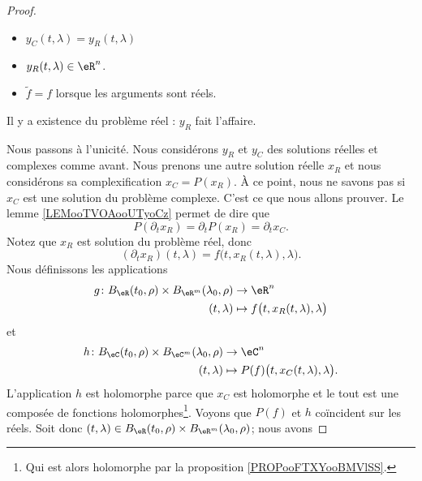 \begin{proof}
\begin{subproof}
\begin{itemize}
			\item
			      \( y_C(t,\lambda)=y_R(t,\lambda)\)
			\item
			      \( y_R(t,\lambda)\in \eR^n\).
			\item
			      \( \tilde f=f\) lorsque les arguments sont réels.
		\end{itemize}
		\spitem[Existence]
		Il y a existence du problème réel : \( y_R\) fait l'affaire.
	\end{subproof}
	Nous passons à l'unicité. Nous considérons \( y_R\) et \( y_C\) des solutions réelles et complexes comme avant. Nous prenons une autre solution réelle \( x_R\) et nous considérons sa complexification \( x_C=P(x_R)\). À ce point, nous ne savons pas si \( x_C\) est une solution du problème complexe. C'est ce que nous allons prouver. Le lemme \ref{LEMooTVOAooUTyoCz} permet de dire que
	\begin{equation}
		P(\partial_tx_R)=\partial_tP(x_R)=\partial_tx_C.
	\end{equation}
	Notez que \( x_R\) est solution du problème réel, donc
	\begin{equation}
		(\partial_tx_R)(t,\lambda)=f\big( t,x_R(t,\lambda),\lambda \big).
	\end{equation}
	Nous définissons les applications
	\begin{equation}
		\begin{aligned}
			g\colon B_{\eR}(t_0,\rho)\times B_{\eR^m}(\lambda_0,\rho) & \to \eR^n                                     \\
			(t,\lambda)                                               & \mapsto f\big( t,x_R(t,\lambda),\lambda \big)
		\end{aligned}
	\end{equation}
	et
	\begin{equation}
		\begin{aligned}
			h\colon B_{\eC}(t_0,\rho)\times B_{\eC^m}(\lambda_0,\rho) & \to \eC^n                                         \\
			(t,\lambda)                                               & \mapsto P(f)\big( t,x_C(t,\lambda),\lambda \big).
		\end{aligned}
	\end{equation}
	L'application \( h\) est holomorphe parce que \( x_C\) est holomorphe et le tout est une composée de fonctions holomorphes\footnote{Qui est alors holomorphe par la proposition \ref{PROPooFTXYooBMVlSS}.}. Voyons que \( P(f)\) et \( h\) coïncident sur les réels. Soit donc \( (t,\lambda)\in B_{\eR}(t_0,\rho)\times B_{\eR^m}(\lambda_0,\rho)\); nous avons

\end{proof}
